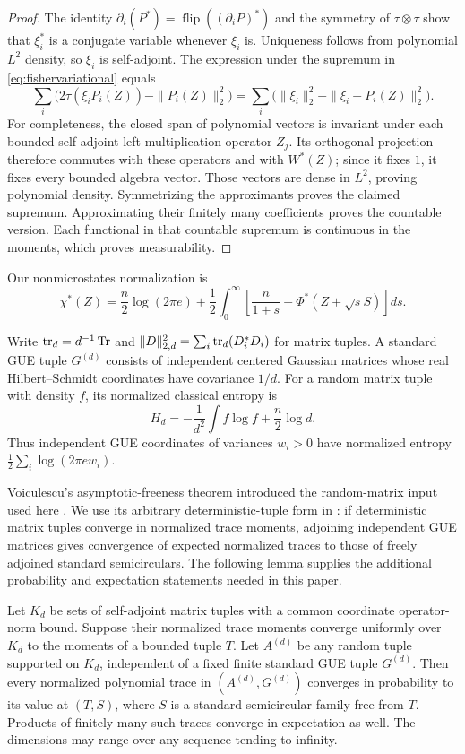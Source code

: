 \begin{proof}
The identity
$\partial_i(P^*)=\operatorname{flip}((\partial_iP)^*)$
and the symmetry of $\tau\otimes\tau$ show that $\xi_i^*$ is a
conjugate variable whenever $\xi_i$ is. Uniqueness follows from polynomial
$L^2$ density, so $\xi_i$ is self-adjoint. The expression under the
supremum in \eqref{eq:fishervariational} equals
\[
 \sum_i\big(2\tau(\xi_iP_i(Z))-\|P_i(Z)\|_2^2\big)
 =\sum_i\big(\|\xi_i\|_2^2-\|\xi_i-P_i(Z)\|_2^2\big).
\]
For completeness, the closed span of polynomial vectors is invariant
under each bounded self-adjoint left multiplication operator $Z_j$.
Its orthogonal projection therefore commutes with these operators and
with $W^*(Z)$; since it fixes $1$, it fixes every bounded algebra vector.
Those vectors are dense in $L^2$, proving polynomial density.
Symmetrizing the approximants proves the claimed supremum. Approximating
their finitely many coefficients proves the countable version. Each
functional in that countable supremum is continuous in the moments,
which proves measurability.
\end{proof}

Our nonmicrostates normalization is
\begin{equation}\label{eq:chistar}
 \chi^*(Z)=\frac n2\log(2\pi e)
 +\frac12\int_0^\infty
 \left[\frac n{1+s}-\Phi^*(Z+\sqrt s S)\right]ds.
\end{equation}

Write $\operatorname{tr}_d=d^{-1}\operatorname{Tr}$ and
$\|D\|_{2,d}^2=\sum_i\operatorname{tr}_d(D_i^*D_i)$ for matrix tuples.
A standard GUE tuple $G^{(d)}$ consists of independent centered Gaussian
matrices whose real Hilbert--Schmidt coordinates have covariance $1/d$.
For a random matrix tuple with density $f$, its normalized classical
entropy is
\[
 H_d=-\frac1{d^2}\int f\log f+\frac n2\log d.
\]
Thus independent GUE coordinates of variances $w_i>0$ have normalized
entropy $\frac12\sum_i\log(2\pi e w_i)$.

Voiculescu's asymptotic-freeness theorem introduced the random-matrix
input used here \cite{Vgue}. We use its arbitrary deterministic-tuple
form in \cite[Theorem~22.35]{NS}: if deterministic matrix tuples
converge in normalized trace moments, adjoining independent GUE matrices
gives convergence of expected normalized traces to those of freely
adjoined standard semicirculars. The following lemma supplies the
additional probability and expectation statements needed in this paper.

\begin{lemma}\label{lem:matrix-convergence}
Let $K_d$ be sets of self-adjoint matrix tuples with a common coordinate
operator-norm bound. Suppose their normalized trace moments converge
uniformly over $K_d$ to the moments of a bounded tuple $T$. Let $A^{(d)}$
be any random tuple supported on $K_d$, independent of a fixed finite
standard GUE tuple $G^{(d)}$. Then every normalized polynomial trace in
$(A^{(d)},G^{(d)})$ converges in probability to its value at $(T,S)$,
where $S$ is a standard semicircular family free from $T$. Products of
finitely many such traces converge in expectation as well. The dimensions
may range over any sequence tending to infinity.
\end{lemma}

